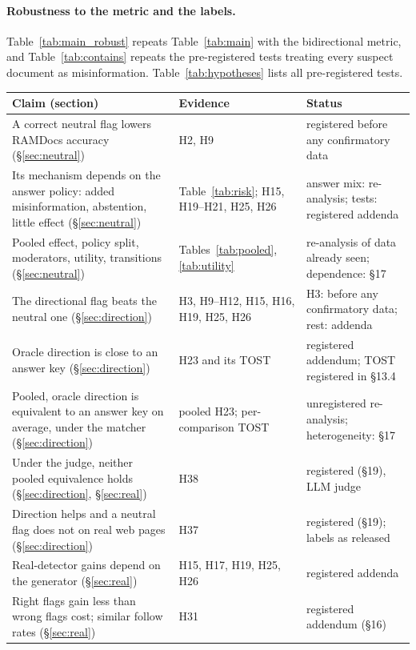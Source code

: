 \paragraph{Robustness to the metric and the labels.}
Table~\ref{tab:main_robust} repeats Table~\ref{tab:main} with the bidirectional metric, and Table~\ref{tab:contains}
repeats the pre-registered tests treating every suspect document as misinformation. Table~\ref{tab:hypotheses}
lists all pre-registered tests.

\begin{table}[t]
\centering\footnotesize
\setlength{\tabcolsep}{4pt}
\begin{tabular}{p{7.4cm}p{3.6cm}p{4.2cm}}
\toprule
Claim (section) & Evidence & Status \\
\midrule
A correct neutral flag lowers RAMDocs accuracy (\S\ref{sec:neutral}) & H2, H9 & registered before any confirmatory data \\
Its mechanism depends on the answer policy: added misinformation, abstention, little effect (\S\ref{sec:neutral}) & Table~\ref{tab:risk}; H15, H19--H21, H25, H26 & answer mix: re-analysis; tests: registered addenda \\
Pooled effect, policy split, moderators, utility, transitions (\S\ref{sec:neutral}) & Tables~\ref{tab:pooled}, \ref{tab:utility} & re-analysis of data already seen; dependence: \S17 \\
The directional flag beats the neutral one (\S\ref{sec:direction}) & H3, H9--H12, H15, H16, H19, H25, H26 & H3: before any confirmatory data; rest: addenda \\
Oracle direction is close to an answer key (\S\ref{sec:direction}) & H23 and its TOST & registered addendum; TOST registered in \S13.4 \\
Pooled, oracle direction is equivalent to an answer key on average, under the matcher (\S\ref{sec:direction}) & pooled H23; per-comparison TOST & unregistered re-analysis; heterogeneity: \S17 \\
Under the judge, neither pooled equivalence holds (\S\ref{sec:direction}, \S\ref{sec:real}) & H38 & registered (\S19), LLM judge \\
Direction helps and a neutral flag does not on real web pages (\S\ref{sec:direction}) & H37 & registered (\S19); labels as released \\
Real-detector gains depend on the generator (\S\ref{sec:real}) & H15, H17, H19, H25, H26 & registered addenda \\
Right flags gain less than wrong flags cost; similar follow rates (\S\ref{sec:real}) & H31 & registered addendum (\S16) \\

\end{tabular}
\end{table}
